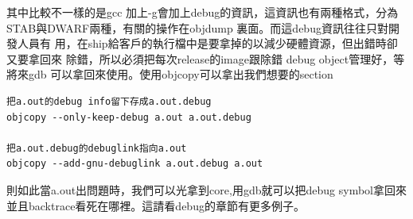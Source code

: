     其中比較不一樣的是gcc 加上-g會加上debug的資訊，這資訊也有兩種格式，分為
    STAB與DWARF兩種，有關的操作在objdump 裏面。而這debug資訊往往只對開發人員有
    用，在ship給客戶的執行檔中是要拿掉的以減少硬體資源，但出錯時卻又要拿回來
    除錯，所以必須把每次release的image跟除錯 debug object管理好，等將來gdb
    可以拿回來使用。使用objcopy可以拿出我們想要的section
    \begin{verbatim}
把a.out的debug info留下存成a.out.debug
objcopy --only-keep-debug a.out a.out.debug

把a.out.debug的debuglink指向a.out
objcopy --add-gnu-debuglink a.out.debug a.out
    \end{verbatim}
    則如此當a.out出問題時，我們可以光拿到core,用gdb就可以把debug symbol拿回來
    並且backtrace看死在哪裡。這請看debug的章節有更多例子。

